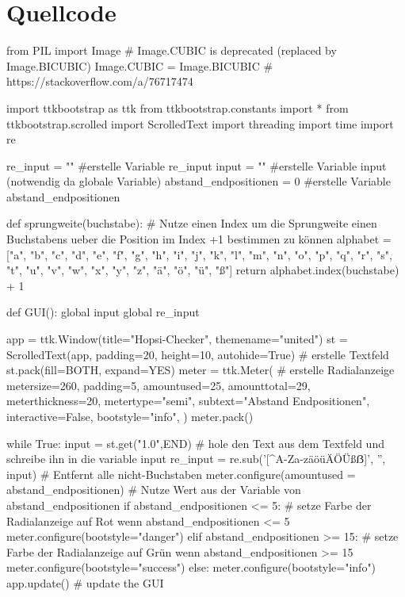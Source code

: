 \documentclass[a4paper,10pt,ngerman]{scrartcl}
\begin{document}
\section{Quellcode}
\begin{python}


from PIL import Image       # Image.CUBIC is deprecated (replaced by Image.BICUBIC)
Image.CUBIC = Image.BICUBIC # https://stackoverflow.com/a/76717474

import ttkbootstrap as ttk
from ttkbootstrap.constants import *
from ttkbootstrap.scrolled import ScrolledText
import threading
import time
import re


re_input = "" #erstelle Variable re_input
input = ""  #erstelle Variable input (notwendig da globale Variable)
abstand_endpositionen = 0 #erstelle Variable abstand_endpositionen


def sprungweite(buchstabe): # Nutze einen Index um die Sprungweite einen Buchstabens ueber die Position im Index +1 bestimmen zu können
    alphabet = ["a", "b", "c", "d", "e", "f", "g", "h", "i", "j", "k", "l", "m", "n", "o", "p", "q", "r", "s", "t", "u", "v", "w", "x", "y", "z", "ä", "ö", "ü", "ß"]
    return alphabet.index(buchstabe) + 1





def GUI():
    global input
    global re_input

    app = ttk.Window(title="Hopsi-Checker", themename="united")
    st = ScrolledText(app, padding=20, height=10, autohide=True) # erstelle Textfeld
    st.pack(fill=BOTH, expand=YES)    
    meter = ttk.Meter( # erstelle Radialanzeige
        metersize=260,
        padding=5,
        amountused=25,
        amounttotal=29,
        meterthickness=20,
        metertype="semi",
        subtext="Abstand Endpositionen",
        interactive=False,
        bootstyle="info",
        )
    meter.pack()

    while True:
        input = st.get("1.0",END) # hole den Text aus dem Textfeld und schreibe ihn in die variable input
        re_input = re.sub('[^A-Za-zäöüÄÖÜßẞ]', '', input) # Entfernt alle nicht-Buchstaben
        meter.configure(amountused = abstand_endpositionen) # Nutze Wert aus der Variable von abstand_endpositionen
        if abstand_endpositionen <= 5: # setze Farbe der Radialanzeige auf Rot wenn abstand_endpositionen <= 5
            meter.configure(bootstyle="danger")
        elif abstand_endpositionen >= 15: # setze Farbe der Radialanzeige auf Grün wenn abstand_endpositionen >= 15
            meter.configure(bootstyle="success")
        else:
            meter.configure(bootstyle="info")
        app.update() # update the GUI
        



\end{python}
\end{document}
